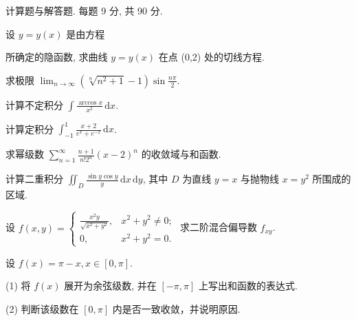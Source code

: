 \par{}
计算题与解答题. 每题 9 分, 共 90 分.\par
\par{}
设 $y = y(x)$ 是由方程\par
\nopagebreak[4]
所确定的隐函数, 求曲线 $y = y(x)$ 在点 (0,2) 处的切线方程.\par
求极限 $\lim_{n\to \infty}\left(\sqrt[n]{n^2 + 1} -1\right)\sin \frac{n\pi}{2}$.\par
计算不定积分 $\int \frac{\arccos x}{x^2} \, \mathrm{d}x$.\par
计算定积分 $\int_{-1}^{1} \frac{x + 2}{e^x + e^{-x}} \, \mathrm{d}x$.\par
求幂级数 $\sum_{n=1}^{\infty} \frac{n+1}{n!2^n}(x-2)^n$ 的收敛域与和函数.\par
计算二重积分 $\iint_{D} \frac{\sin y \cos y}{y} \, \mathrm{d}x \, \mathrm{d}y$, 其中 $D$ 为直线 $y = x$ 与抛物线 $x = y^2$ 所围成的区域.\par
设 $f(x, y) = \begin{cases} \frac{x^2y}{\sqrt{x^2 + y^2}}, & x^2 + y^2 \neq 0; \\ 0, & x^2 + y^2 = 0. \end{cases}$ 求二阶混合偏导数 $f_{xy}$.\par
设 $f(x) = \pi - x, x \in [0, \pi]$.\par
(1) 将 $f(x)$ 展开为余弦级数, 并在 $[- \pi, \pi]$ 上写出和函数的表达式.\par
(2) 判断该级数在 $[0, \pi]$ 内是否一致收敛，并说明原因.\par
